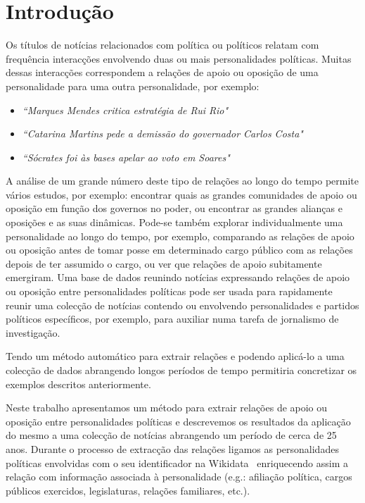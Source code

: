 \documentclass[a4paper, twocolumn, 11pt, twoside]{article}
\begin{document}

\section{Introdução}
\label{sec:intro}

Os títulos de notícias relacionados com política ou políticos relatam com frequência interacções envolvendo duas ou mais personalidades políticas. Muitas dessas interacções correspondem a relações de apoio ou oposição de uma personalidade para uma outra personalidade, por exemplo:

\begin{itemize}
\item{\textit{``Marques Mendes critica estratégia de Rui Rio"}}
\item{\textit{``Catarina Martins pede a demissão do governador Carlos Costa"}}
\item{\textit{``Sócrates foi às bases apelar ao voto em Soares"}}
\end{itemize}

A análise de um grande número deste tipo de relações ao longo do tempo permite vários estudos, por exemplo: encontrar quais as grandes comunidades de apoio ou oposição em função dos governos no poder, ou encontrar as grandes alianças e oposições e as suas dinâmicas. Pode-se também explorar individualmente uma personalidade ao longo do tempo, por exemplo, comparando as relações de apoio ou oposição antes de tomar posse em determinado cargo público com as relações depois de ter assumido o cargo, ou ver que relações de apoio subitamente emergiram. Uma base de dados reunindo notícias expressando relações de apoio ou oposição entre personalidades políticas pode ser usada para rapidamente reunir uma colecção de notícias contendo ou envolvendo personalidades e partidos políticos específicos, por exemplo, para auxiliar numa tarefa de jornalismo de investigação. 

Tendo um método automático para extrair relações e podendo aplicá-lo a uma colecção de dados abrangendo longos períodos de tempo permitiria concretizar os exemplos descritos anteriormente.

Neste trabalho apresentamos um método para extrair relações de apoio ou oposição entre personalidades políticas e descrevemos os resultados da aplicação do mesmo a uma colecção de notícias abrangendo um período de cerca de 25 anos. Durante o processo de extracção das relações ligamos as personalidades políticas envolvidas com o seu identificador na Wikidata~\citep{MKGGB2018} enriquecendo assim a relação com informação associada à personalidade (e.g.: afiliação política, cargos públicos exercidos, legislaturas, relações familiares, etc.). 
\end{document}
